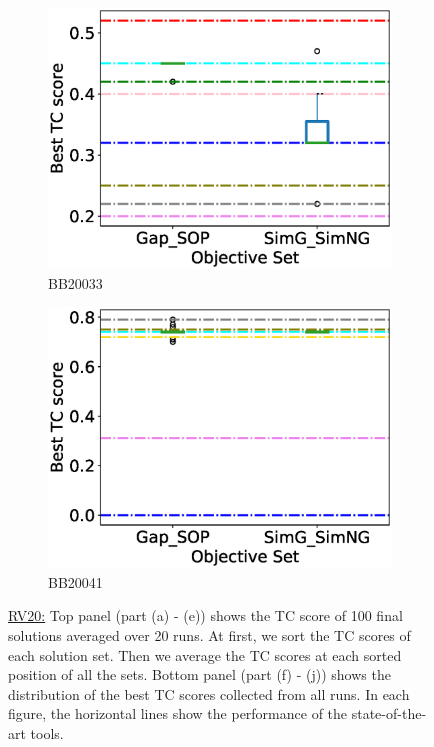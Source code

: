 \begin{figure}[!htbp]
\begin{adjustwidth}{-1cm}{-1cm}
\begin{subfigure}{0.22\textwidth}
			\includegraphics[width=\columnwidth]{Figure/summary/precomputedInit/Balibase/BB20033_objset_tc_rank_2}
			\caption{BB20033}
		\end{subfigure}
		\begin{subfigure}{0.22\textwidth}
			\includegraphics[width=\columnwidth]{Figure/summary/precomputedInit/Balibase/BB20041_objset_tc_rank_2}
			\caption{BB20041}
		\end{subfigure}
		\caption{\underline{RV20:} Top panel (part (a) - (e)) shows the TC score of 100 final solutions averaged over 20 runs. At first, we sort the TC scores of each solution set. Then we average the TC scores at each sorted position of all the sets. Bottom panel (part (f) - (j)) shows the distribution of the best TC scores collected from all runs. In each figure, the horizontal lines show the performance of the state-of-the-art tools.}
		\label{fig:rv20_tc}
	\end{adjustwidth}
\end{figure}

